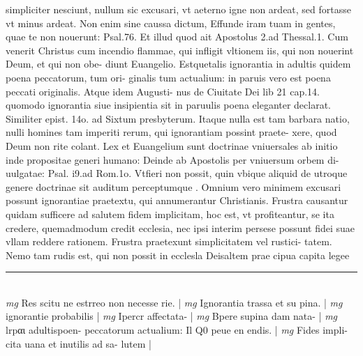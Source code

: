 \documentclass{article}
\begin{document}
\begin{pages}
simpliciter nesciunt, nullum sic excusari, vt aeterno igne non ardeat, sed fortasse vt minus ardeat. Non enim sine caussa dictum, Effunde iram tuam in gentes, quae te non nouerunt: Psal.76. Et illud quod ait Apostolus 2.ad Thessal.1. Cum venerit Christus cum incendio flammae, qui infligit vltionem iis, qui non nouerint Deum, et qui non obe- diunt Euangelio. Estquetalis ignorantia in adultis quidem poena peccatorum, tum ori- ginalis tum actualium: in paruis vero est poena peccati originalis. Atque  idem Augusti- nus de Ciuitate Dei lib 21 cap.14. quomodo ignorantia siue insipientia sit in paruulis poena eleganter declarat. Similiter epist. 14o. ad Sixtum presbyterum. Itaque  nulla est tam barbara natio, nulli homines tam imperiti rerum, qui ignorantiam possint praete- xere, quod Deum non rite colant. Lex et Euangelium sunt doctrinae vniuersales ab initio inde propositae generi humano: Deinde ab Apostolis per vniuersum orbem di- uulgatae: Psal. i9.ad Rom.1o. Vtfieri non possit, quin vbique  aliquid de utroque  genere doctrinae sit auditum perceptumque .  \pend\pstart Omnium vero minimem excusari possunt ignorantiae praetextu, qui annumerantur Christianis. Frustra causantur quidam sufficere ad salutem fidem implicitam, hoc est, vt profiteantur, se ita credere, quemadmodum credit ecclesia, nec ipsi interim persese possunt fidei suae vllam reddere rationem. Frustra praetexunt simplicitatem vel rustici- tatem. Nemo tam rudis est, qui non possit in ecclesla Deisaltem prae cipua capita legee  \pend
\vspace{0.5cm}\noindent
\vspace{0.2cm}\rule{1cm}{0.2pt}\\ 
\hspace{0.2cm}\textit{mg}
\footnotesize Res scitu ne estrreo non necesse rie. 
\normalsize| 
\hspace{0.2cm}\textit{mg}
\footnotesize Ignorantia trassa et su pina. 
\normalsize| 
\hspace{0.2cm}\textit{mg}
\footnotesize ignorantie probabilis 
\normalsize| 
\hspace{0.2cm}\textit{mg}
\footnotesize Ipercr affectata- 
\normalsize| 
\hspace{0.2cm}\textit{mg}
\footnotesize Bpere supina dam nata- 
\normalsize| 
\hspace{0.2cm}\textit{mg}
\footnotesize lrpαι adultispoen- peccatorum actualium: Il Q0 peue en endis. 
\normalsize| 
\hspace{0.2cm}\textit{mg}
\footnotesize Fides impli- cita uana et inutilis ad sa- lutem 
\normalsize| 

\end{pages}
\end{document}
